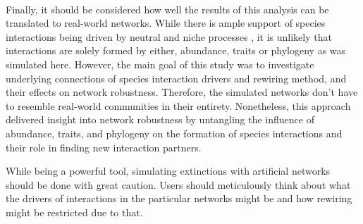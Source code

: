 \documentclass[12pt,a4paper]{article}
\begin{document}

\paragraph{}

%



Finally, it should be considered how well the results of this analysis can be translated to real-world networks. While there is ample support of species interactions being driven by neutral and niche processes \parencite{Jordano2003, Rezende2007, Vazquez2007, Bluethgen2008}, it is unlikely that interactions are solely formed by either, abundance, traits or phylogeny as was simulated here. However, the main goal of this study was to investigate underlying
connections of species interaction drivers and rewiring method, and their effects on network robustness. Therefore, the simulated networks don't have to resemble real-world communities in their entirety. Nonetheless, this approach delivered insight into network robustness by untangling the influence of abundance, traits, and phylogeny on the formation of species interactions and their role in finding new interaction partners.

While being a powerful tool, simulating extinctions with artificial networks should be done with great caution. Users should meticulously think about what the drivers of interactions in the particular networks might be and how rewiring might be restricted due to that. 
\end{document}
